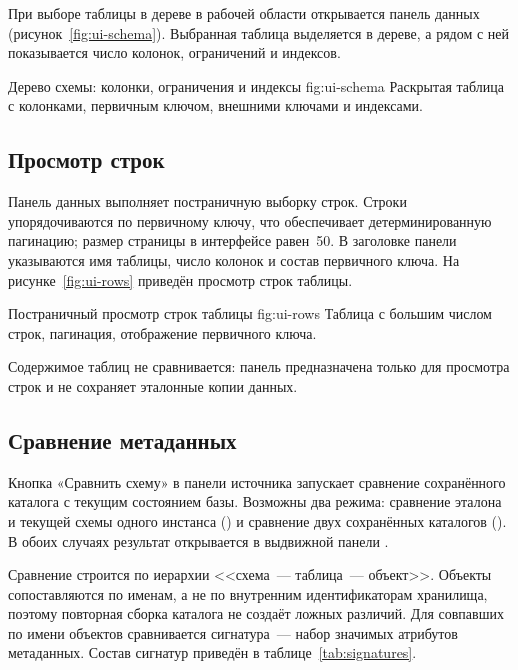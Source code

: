 \documentclass[../main.tex]{subfiles}
\begin{document}
При выборе таблицы в дереве в рабочей области открывается панель
данных (рисунок~\ref{fig:ui-schema}). Выбранная таблица выделяется
в дереве, а рядом с ней показывается число колонок, ограничений
и индексов.

  {Дерево схемы: колонки, ограничения и индексы}
  {fig:ui-schema}
  {Раскрытая таблица с колонками, первичным ключом, внешними ключами
   и индексами.}

\subsection{Просмотр строк}

Панель данных выполняет постраничную выборку строк. Строки
упорядочиваются по первичному ключу, что обеспечивает
детерминированную пагинацию; размер страницы в интерфейсе равен~50.
В заголовке панели указываются имя таблицы, число колонок и состав
первичного ключа. На рисунке~\ref{fig:ui-rows} приведён просмотр
строк таблицы.

  {Постраничный просмотр строк таблицы}
  {fig:ui-rows}
  {Таблица с большим числом строк, пагинация, отображение первичного
   ключа.}

Содержимое таблиц не сравнивается: панель предназначена только для
просмотра строк и не сохраняет эталонные копии данных.

\subsection{Сравнение метаданных}

Кнопка «Сравнить схему» в панели источника запускает сравнение
сохранённого каталога с текущим состоянием базы. Возможны два
режима: сравнение эталона и текущей схемы одного инстанса
() и сравнение двух сохранённых
каталогов (). В обоих случаях
результат открывается в выдвижной панели .

Сравнение строится по иерархии <<схема~--- таблица~--- объект>>.
Объекты сопоставляются по именам, а не по внутренним
идентификаторам хранилища, поэтому повторная сборка каталога не
создаёт ложных различий. Для совпавших по имени объектов сравнивается
сигнатура~--- набор значимых атрибутов метаданных. Состав сигнатур
приведён в таблице~\ref{tab:signatures}.
\end{document}
